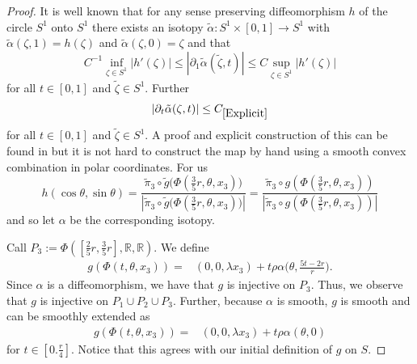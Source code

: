 \documentclass[12pt,a4paper]{amsart}
\theoremstyle{plain}
\theoremstyle{definition}
\numberwithin{equation}{section}
\def\er{\mathbb R}
\begin{document}
\begin{proof}
		It is well known that for any sense preserving diffeomorphism $h$ of the circle $S^1$ onto $S^1$ there exists an isotopy $\tilde{\alpha}: S^1\times[0,1] \to S^1$ with $\tilde{\alpha}(\zeta,1) = h(\zeta)$ and $\tilde{\alpha}(\zeta,0) = \zeta$ and that 
		\begin{equation}\label{SDRProp}
			C^{-1}\inf_{\zeta \in S^1}|h'(\zeta)|\leq |\partial_{1}\tilde{\alpha}(\tilde{\zeta},t)| \leq C\sup_{\zeta\in S^1}|h'(\zeta)|
		\end{equation}
		for all $t\in [0,1]$ and $\tilde{\zeta} \in S^1$. Further 
		\begin{equation}\label{Explicit}
			|\partial_{t}\tilde{\alpha}(\zeta,t)|\leq C_{\ref{Explicit}}
		\end{equation}
		for all $t\in [0,1]$ and $\tilde{\zeta} \in S^1$. A proof and explicit construction of this can be found in \cite[Section~3.1]{MP} but it is not hard to construct the map by hand using a smooth convex combination in polar coordinates. For us
		$$
		h(\cos\theta, \sin\theta) = \frac{\tilde{\pi}_3\circ\tilde{g}\big(\Phi(\tfrac{3}{5}r,\theta,x_3)\big)}{|\tilde{\pi}_3\circ\tilde{g}\big(\Phi(\tfrac{3}{5}r,\theta,x_3)\big)|} = \frac{\tilde{\pi}_3\circ g(\Phi(\tfrac{3}{5}r,\theta,x_3))}{|\tilde{\pi}_3\circ g(\Phi(\tfrac{3}{5}r,\theta,x_3))|}
		$$
		and so let $\alpha$ be the corresponding isotopy.
		
		
		Call $P_3 := \Phi([\tfrac{2}{5}r,\tfrac{3}{5}r],\er,\er)$. We define 
		$$
		\begin{aligned}
			g(\Phi(t,\theta,x_3)) = & (0,0,\lambda x_3) +t\rho \alpha\Big(\theta,\frac{5t-2r}{r}\Big).
		\end{aligned}
		$$
		Since $\alpha$ is a diffeomorphism, we have that $g$ is injective on $P_3$. Thus, we observe that $g$ is injective on $P_1\cup P_2\cup P_3$. Further, because $\alpha$ is smooth, $g$ is smooth and can be smoothly extended as 
		$$
		\begin{aligned}
			g(\Phi(t,\theta,x_3)) = & (0,0,\lambda x_3) + t\rho\alpha(\theta, 0)
		\end{aligned}
		$$
		for $t\in [0.\tfrac{r}{4}]$. Notice that this agrees with our initial definition of $g$ on $S$.
		

\end{proof}
\end{document}
